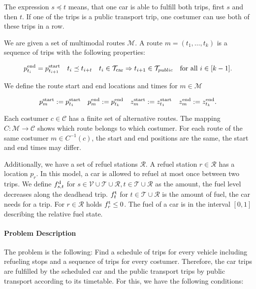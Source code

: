 The expression $s\preceq t$ means, that one car is able to fulfill both trips, first $s$ and then $t$. If one of the trips is a public transport trip, one costumer can use both of these trips in a row.

We are given a set of multimodal routes $\mathcal{M}$. A route $m=\left(t_1,\dots,t_k\right)$ is a sequence of trips with the following properties:

\begin{align*}
	p^{\operatorname{end}}_{t_i} = p^{\operatorname{start}}_{t_{i+1}} & & t_i\preceq t_{i+t} & & t_i\in\mathcal{T}_{\operatorname{car}}\Rightarrow t_{i+1}\in\mathcal{T}_{public} & & \text{for all } i\in[k-1].
\end{align*}

We define the route start and end locations and times for $m\in\mathcal{M}$

\begin{align*}
	p^{\operatorname{start}}_m := p^{\operatorname{start}}_{t_1} & &  p^{\operatorname{end}}_m := p^{\operatorname{end}}_{t_k} & & z^{\operatorname{start}}_m := z^{\operatorname{start}}_{t_1} & & z^{\operatorname{end}}_m := z^{\operatorname{end}}_{t_k}.
\end{align*}

Each costumer $c\in\mathcal{C}$ has a finite set of alternative routes. The mapping $C:\mathcal{M}\to\mathcal{C}$ shows which route belongs to which costumer. For each route of the same costumer $m\in C^{-1}(c)$, the start and end positions are the same, the start and end times may differ. 

Additionally, we have a set of refuel stations $\mathcal{R}$. A refuel station $r\in\mathcal{R}$ has a location $p_r$. In this model, a car is allowed to refuel at most once between two trips. We define $f^{\operatorname{d}}_{s,t}$ for $s\in\mathcal{V}\cup\mathcal{T}\cup\mathcal{R},t\in\mathcal{T}\cup\mathcal{R}$ as the amount, the fuel level decreases along the deadhead trip. $f^{\operatorname{t}}_t$ for $t\in\mathcal{T}\cup\mathcal{R}$ is the amount of fuel, the car needs for a trip. For $r\in\mathcal{R}$ holds $f^{\operatorname{t}}_r \leq 0$. The fuel of a car is in the interval $[0,1]$ describing the relative fuel state.

\paragraph{Problem Description} \parfill

The problem is the following: Find a schedule of trips for every vehicle including refueling stops and a sequence of trips for every costumer. Therefore, the car trips are fulfilled by the scheduled car and the public transport trips by public transport according to its timetable. For this, we have the following conditions:

